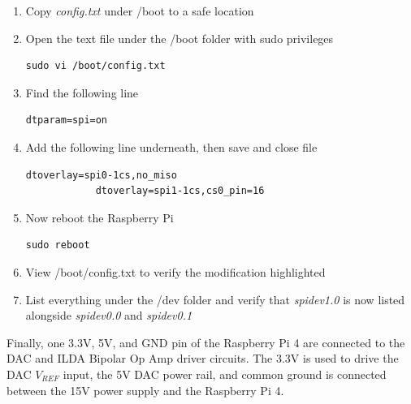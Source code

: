 \documentclass[journal]{IEEEtran}
\begin{document}
    \begin{enumerate}
        \item Copy \emph{config.txt} under /boot to a safe location
        \item Open the text file under the /boot folder with sudo privileges
        
        \begin{lstlisting}[frame=single, basicstyle=\ttfamily\footnotesize, breaklines=true]
            sudo vi /boot/config.txt
        \end{lstlisting}

        \item Find the following line
        
        \begin{lstlisting}[frame=single, basicstyle=\ttfamily\footnotesize, breaklines=true]
            dtparam=spi=on
        \end{lstlisting}

        \item Add the following line underneath, then save and close file
        
        \begin{lstlisting}[frame=single, basicstyle=\ttfamily\footnotesize, breaklines=true]
            dtoverlay=spi0-1cs,no_miso
            dtoverlay=spi1-1cs,cs0_pin=16
        \end{lstlisting}

        \item Now reboot the Raspberry Pi
        
        \begin{lstlisting}[frame=single, basicstyle=\ttfamily\footnotesize, breaklines=true]
            sudo reboot
        \end{lstlisting}

        \item View /boot/config.txt to verify the modification highlighted
        \item List everything under the /dev folder and verify that \emph{spidev1.0} is now listed alongside \emph{spidev0.0} and \emph{spidev0.1}
    \end{enumerate}

    Finally, one 3.3V, 5V, and GND pin of the Raspberry Pi 4 are connected to the DAC and ILDA Bipolar Op Amp driver circuits. 
    The 3.3V is used to drive the DAC $V_{REF}$ input, the 5V DAC power rail, and common ground is connected between the 15V power supply and the Raspberry Pi 4.
\end{document}
